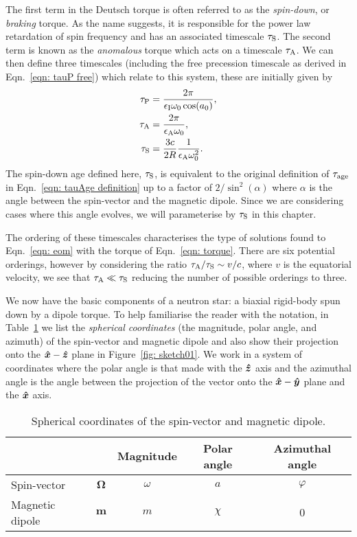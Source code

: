 \documentclass[../full_thesis/full_thesis.tex]{subfiles}
\begin{document}
The first term in the Deutsch torque is often referred to as the
\emph{spin-down}, or \emph{braking} torque. As the name suggests, it is
responsible for the power law retardation of spin frequency and has an
associated timescale $\tau_{\mathrm{S}}$. The second term is known as the
\emph{anomalous} torque which acts on a timescale $\tau_{\mathrm{A}}$. We can then
define three
timescales (including the free precession timescale as derived in
Eqn.~\eqref{eqn: tauP free}) which relate to this system, these are
initially given by
\begin{align}
\tau_{\mathrm{P}} &=\frac{2\pi}{\epsilon_{\mathrm{I}}\omega_0\cos(a_0)},  \\
\tau_{\mathrm{A}} &=\frac{2\pi}{\epsilon_{\mathrm{A}}\omega_0}, \label{eqn: anomalous timescale} \\
\tau_{\mathrm{S}} &=\frac{3c}{2R}\frac{1}{\epsilon_{\mathrm{A}}\omega_0^{2}}.
\end{align}
The spin-down age defined here, $\tau_{\mathrm{S}}$, is equivalent to the original
definition of $\tau_{\mathrm{age}}$ in Eqn.~\eqref{eqn: tauAge definition} up to a factor
of $2/\sin^{2}(\alpha)$ where $\alpha$ is the angle between the spin-vector and
the magnetic dipole. Since we are considering cases where this angle evolves, we
will parameterise by $\tau_{\mathrm{S}}$ in this chapter.

The ordering of these timescales characterises the type of solutions found to
Eqn.~\eqref{eqn: eom} with the torque of Eqn.~\eqref{eqn: torque}. There are
six potential orderings, however by considering the ratio $\tau_{\mathrm{A}}/\tau_{\mathrm{S}}
\sim v/c$, where $v$ is the equatorial velocity, we see that $\tau_{\mathrm{A}} \ll
\tau_{\mathrm{S}}$ reducing the number of possible orderings to three.

We now have the basic components of a neutron star: a biaxial rigid-body spun
down by a dipole torque. To help familiarise the reader with the notation, in
Table~\ref{tab: definitions} we list the \emph{spherical coordinates} (the
magnitude, polar angle, and azimuth) of the spin-vector
and magnetic dipole and also show their projection onto the $\boldsymbol{\hat{x}}-\boldsymbol{\hat{z}}$ plane in
Figure~\ref{fig: sketch01}. We work in a system of coordinates where the polar
angle is that made with the $\boldsymbol{\hat{z}}$ axis and the azimuthal angle is the angle between
the projection of the vector onto the $\boldsymbol{\hat{x}}-\boldsymbol{\hat{y}}$ plane and the $\boldsymbol{\hat{x}}$ axis.
\begin{table}[ht]
\centering
\begin{tabular}{|l|c|c|c|c|} \hline
 \multicolumn{2}{|c|}{} & Magnitude & Polar angle & Azimuthal angle \\ \hline
Spin-vector  & $\boldsymbol{\Omega}$ & $\omega$ & $a$ & $\varphi$ \\ \hline
Magnetic dipole &  $\boldsymbol{m}$ & $m$ & $\chi$ & 0 \\ \hline
\end{tabular}
\caption{Spherical coordinates of the spin-vector and magnetic dipole.}
\label{tab: definitions}
\end{table}
\end{document}
